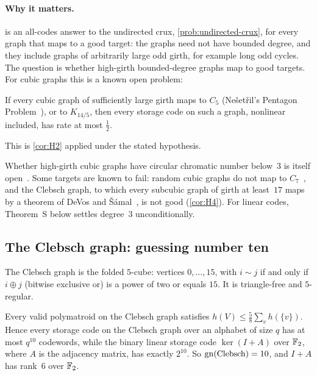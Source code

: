 \paragraph{Why it matters.}  is an all-codes answer to the undirected crux, \cref{prob:undirected-crux}, for
every graph that maps to a good target: the graphs need not have bounded degree, and they include graphs of arbitrarily
large odd girth, for example long odd cycles. The question is
whether high-girth bounded-degree graphs map to good targets. For cubic graphs this is a known open problem:

\begin{corollary}\label{cor:H3}
If every cubic graph of sufficiently large girth maps to $C_5$ (Nešetřil's Pentagon Problem~\cite{Nesetril1999}), or to
$K_{14/5}$, then every storage code on such a graph, nonlinear included, has rate at most $\tfrac12$.
\end{corollary}

\begin{outline}
This is \cref{cor:H2} applied under the stated hypothesis.
\end{outline}

Whether high-girth cubic graphs have circular chromatic number below~$3$ is itself open~\cite{DaneshgarMadani2015}. Some
targets are known to fail: random cubic graphs do not map to $C_7$~\cite{Hatami2005}, and the Clebsch graph, to which every
subcubic graph of girth at least~$17$ maps by a theorem of DeVos and Šámal~\cite{DeVosSamal2006}, is not good
(\cref{cor:H4}). For linear codes, Theorem~S below settles degree~$3$ unconditionally.

\subsection{The Clebsch graph: guessing number ten}\label{sec:clebsch}

The Clebsch graph is the folded $5$-cube: vertices $0,\dots,15$, with $i\sim j$ if and only if $i\oplus j$ (bitwise
exclusive or) is a power of two or equals $15$. It is triangle-free and $5$-regular.

\begin{corollary}[Corollary H4: $\gn(\text{Clebsch})=10$]\label{cor:H4}
Every valid polymatroid on the Clebsch graph satisfies $h(V)\le\tfrac58\sum_vh(\{v\})$. Hence every storage code on the
Clebsch graph over an alphabet of size $q$ has at most $q^{10}$ codewords, while the binary linear storage code
$\ker(I+A)$ over $\mathbb{F}_2$, where $A$ is the adjacency matrix, has exactly $2^{10}$. So $\gn(\text{Clebsch})=10$, and
$I+A$ has rank~$6$ over $\mathbb{F}_2$.
\end{corollary}

